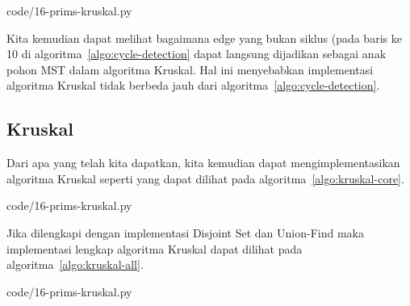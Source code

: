 
                {code/16-prims-kruskal.py}

Kita kemudian dapat melihat bagaimana edge yang bukan siklus (pada baris ke 10 di algoritma~\ref{algo:cycle-detection} dapat langsung dijadikan sebagai anak pohon MST dalam algoritma Kruskal. Hal ini menyebabkan implementasi algoritma Kruskal tidak berbeda jauh dari algoritma~\ref{algo:cycle-detection}. 

\subsection{Kruskal}

Dari apa yang telah kita dapatkan, kita kemudian dapat mengimplementasikan algoritma Kruskal seperti yang dapat dilihat pada algoritma~\ref{algo:kruskal-core}.


                {code/16-prims-kruskal.py}

Jika dilengkapi dengan implementasi Disjoint Set dan Union-Find maka implementasi lengkap algoritma Kruskal dapat dilihat pada algoritma~\ref{algo:kruskal-all}.


                {code/16-prims-kruskal.py}
